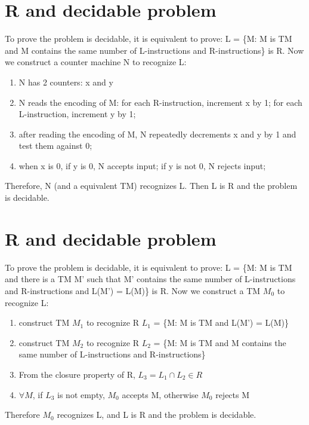 \documentclass{article}
\begin{document}
\section{R and decidable problem}
To prove the problem is decidable, it is equivalent to prove:
L = \{M: M is TM and M contains the same number of L-instructions and
R-instructions\} is R. Now we construct a counter machine N to recognize L:
\begin{enumerate}
  \item N has 2 counters: x and y
  \item N reads the encoding of M: for each R-instruction, increment x by 1; for
  each L-instruction, increment y by 1;
  \item after reading the encoding of M, N repeatedly decrements x and y by 1
  and test them against 0;
  \item when x is 0, if y is 0, N accepts input; if y is not 0, N rejects input;
\end{enumerate}
Therefore, N (and a equivalent TM) recognizes L. Then L is R and the problem is
decidable.

\section{R and decidable problem}
To prove the problem is decidable, it is equivalent to prove:
L = \{M: M is TM and there is a TM M' such that M' contains the same number of
L-instructions and R-instructions and L(M') = L(M)\} is R. Now we construct a TM
$M_0$ to recognize L:
\begin{enumerate}
  \item construct TM $M_1$ to recognize R $L_1$ = \{M: M is TM and L(M') =
  L(M)\}
  \item construct TM $M_2$ to recognize R $L_2$ = \{M: M is TM and M contains
  the same number of L-instructions and R-instructions\}
  \item From the closure property of R, $L_3 = L_1 \cap L_2 \in R$
  \item $\forall M$, if $L_3$ is not empty, $M_0$ accepts M, otherwise $M_0$
  rejects M
\end{enumerate}
Therefore $M_0$ recognizes L, and L is R and the problem is decidable.
\end{document}

